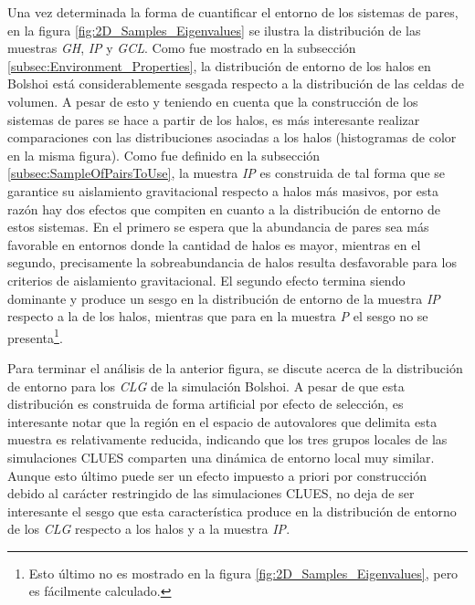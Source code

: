 Una vez determinada la forma de cuantificar el entorno de los sistemas de
pares, en la figura \ref{fig:2D_Samples_Eigenvalues} se ilustra la 
distribución de las muestras \textit{GH}, \textit{IP} y \textit{GCL}.
Como fue mostrado en la subsección \ref{subsec:Environment_Properties}, 
la distribución de entorno de los halos en Bolshoi está considerablemente
sesgada respecto a la distribución de las celdas de volumen. A pesar de 
esto y teniendo en cuenta que la construcción de los sistemas de pares se 
hace a partir de los halos, es más interesante realizar comparaciones con las 
distribuciones asociadas a los halos (histogramas de color en la misma figura).
Como fue definido en la subsección \ref{subsec:SampleOfPairsToUse}, la 
muestra \textit{IP} es construida de tal forma que se garantice su
aislamiento gravitacional respecto a halos más masivos, por esta razón hay
dos efectos que compiten en cuanto a la distribución de entorno de estos 
sistemas. En el primero se espera que la abundancia de pares sea más 
favorable en entornos donde la cantidad de halos es mayor, mientras en el
segundo, precisamente la sobreabundancia de halos resulta desfavorable para
los criterios de aislamiento gravitacional. El segundo efecto termina siendo
dominante y produce un sesgo en la distribución de entorno
de la muestra \textit{IP} respecto a la de los halos, mientras que para en 
la muestra \textit{P} el sesgo no se presenta\footnote{Esto 
último no es mostrado en la figura \ref{fig:2D_Samples_Eigenvalues}, pero
es fácilmente calculado.}. 


Para terminar el análisis de la anterior figura, se discute acerca de la 
distribución de entorno para los \textit{CLG} de la simulación Bolshoi. A 
pesar de que esta distribución es construida de forma artificial por 
efecto de selección, es interesante notar que la región en el espacio de 
autovalores que delimita esta muestra es relativamente reducida, indicando 
que los tres grupos locales de las simulaciones CLUES comparten una 
dinámica de entorno local muy similar. Aunque esto último puede ser un 
efecto impuesto a priori por construcción debido al carácter restringido 
de las simulaciones CLUES, no deja de ser interesante el sesgo que esta 
característica produce en la distribución de entorno de los \textit{CLG} 
respecto a los halos y a la muestra \textit{IP}.


